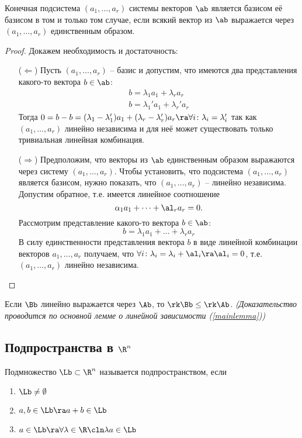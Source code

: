 \begin{theorem}
  Конечная подсистема $(a_1,\dots, a_r)$ системы векторов $\ab$ является базисом её базисом в том и только том случае, если всякий вектор из $\ab$ выражается через $(a_1,\dots, a_r)$ единственным образом.
\end{theorem}
\begin{proof}
  Докажем необходимость и достаточность:
  \begin{itemize}
    \item[($\Leftarrow$)]  Пусть $(a_1,\dots, a_r)$ -- базис и допустим, что имеются два представления какого-то вектора $b\in\ab$:
    \begin{gather*}
     b=\lambda_1a_1+\lambda_ra_r\\
     b=\lambda_1'a_1+\lambda_r'a_r
    \end{gather*}
    Тогда $0=b-b=(\lambda_1-\lambda_1')a_1+(\lambda_r-\lambda_r')a_r\ra\forall i\colon\lambda_i=\lambda_i'$ так как $(a_1,\dots, a_r)$ линейно независима и для неё может существовать только тривиальная линейная комбинация.
    
    \item[($\Rightarrow$)] Предположим, что векторы из $\ab$ единственным образом выражаются через систему $(a_1,\dots, a_r)$. Чтобы установить, что подсистема $(a_1,\dots, a_r)$ является базисом, нужно показать, что $(a_1,\dots, a_r)$ -- линейно независима. Допустим обратное, т.е. имеется линейное соотношение
    $$\alpha_1a_1+\dots+\al_ra_r=0.$$
    Рассмотрим представление какого-то вектора $b\in\ab$:
    $$b=\lambda_1a_1+\dots+\lambda_ra_r$$
    В силу единственности представления вектора $b$ в виде линейной комбинации векторов $a_1,\dots, a_r$ получаем, что $\forall i\colon\lambda_i=\lambda_i+\al_i\ra \al_i=0$, т.е. $(a_1,\dots, a_r)$ линейно независима.
  \end{itemize}
\end{proof}

\begin{stm}
  Если $\Bb$ линейно выражается через $\Ab$, то $\rk \Bb\le\rk\Ab$. \emph{(Доказательство проводится по основной лемме о линейной зависимости (\ref{mainlemma}))}
\end{stm}

\subsection{Подпространства в $\R^n$}

\begin{df}
  Подмножество $\Lb\subset \R^n$ называется подпространством, если
  \begin{enumerate}
    \item $\Lb\ne\emptyset$
    \item $a,b\in\Lb\ra a+b\in\Lb$
    \item $a\in\Lb\ra \forall\lambda\in\R\cln\lambda a\in\Lb$
  \end{enumerate}
\end{df}

